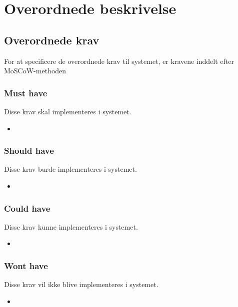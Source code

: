 \chapter{Overordnede beskrivelse}

\section{Overordnede krav}

For at specificere de overordnede krav til systemet, er kravene inddelt efter MoSCoW-methoden %

\subsection{Must have}

Disse krav skal implementeres i systemet.

\begin{itemize}
    \item 
\end{itemize}

\subsection{Should have}

Disse krav burde implementeres i systemet.

\begin{itemize}
    \item 
\end{itemize}

\subsection{Could have}

Disse krav kunne implementeres i systemet.

\begin{itemize}
    \item 
\end{itemize}

\subsection{Wont have}

Disse krav vil ikke blive implementeres i systemet.

\begin{itemize}
    \item 
\end{itemize}



